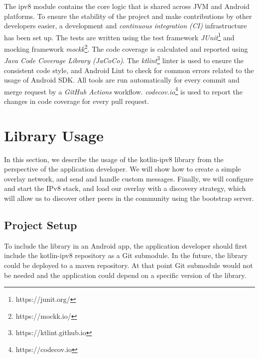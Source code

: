 The ipv8 module contains the core logic that is shared across JVM and Android platforms. To ensure the stability of the project and make contributions by other developers easier, a development and \textit{continuous integration (CI)} infrastructure has been set up. The tests are written using the test framework \textit{JUnit}\footnote{https://junit.org/} and mocking framework \textit{mockk}\footnote{https://mockk.io/}. The code coverage is calculated and reported using \textit{Java Code Coverage Library (JaCoCo)}. The \textit{ktlint}\footnote{https://ktlint.github.io} linter is used to ensure the consistent code style, and Android Lint to check for common errors related to the usage of Android SDK. All tools are run automatically for every commit and merge request by a \textit{GitHub Actions} workflow. \textit{codecov.io}\footnote{https://codecov.io} is used to report the changes in code coverage for every pull request.




\iffalse
\section{Library Usage}

In this section, we describe the usage of the kotlin-ipv8 library from the perspective of the application developer. We will show how to create a simple overlay network, and send and handle custom messages. Finally, we will configure and start the IPv8 stack, and load our overlay with a discovery strategy, which will allow us to discover other peers in the community using the bootstrap server.

\subsection{Project Setup}

To include the library in an Android app, the application developer should first include the kotlin-ipv8 repository as a Git submodule. In the future, the library could be deployed to a maven repository. At that point Git submodule would not be needed and the application could depend on a specific version of the library.

